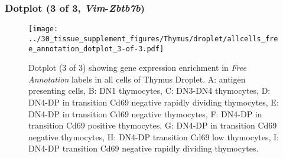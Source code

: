\subsubsection{Dotplot (3 of 3, \emph{Vim}-\emph{Zbtb7b})}
\begin{figure}[h]
\centering
\texttt{[image: ../30\_tissue\_supplement\_figures/Thymus/droplet/allcells\_free\_annotation\_dotplot\_3-of-3.pdf]}

\caption{ Dotplot (3 of 3)  showing gene expression enrichment in \emph{Free Annotation} labels in all cells of Thymus Droplet. A: antigen presenting cells, B: DN1 thymocytes, C: DN3-DN4 thymocytes, D: DN4-DP in transition Cd69 negative rapidly dividing thymocytes, E: DN4-DP in transition Cd69 negative thymocytes, F: DN4-DP in transition Cd69 positive thymocytes, G: DN4-DP in transition Cd69 negative thymocytes, H: DN4-DP transition Cd69 low thymocytes, I: DN4-DP transition Cd69 negative rapidly dividing thymocytes.}
\end{figure}

